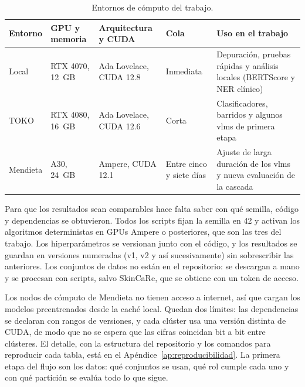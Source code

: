 \begin{table}[H]
    \centering
    \caption{Entornos de cómputo del trabajo.}
    \label{tab:met_entorno}
    \small
    \begin{tabularx}{\textwidth}{@{}>{\raggedright\arraybackslash}p{1.9cm}>{\raggedright\arraybackslash}p{2.5cm}%
        >{\raggedright\arraybackslash}p{2.9cm}>{\raggedright\arraybackslash}p{2.0cm}X@{}}
        \toprule
        \textbf{Entorno} & \textbf{GPU y memoria} & \textbf{Arquitectura y CUDA} & \textbf{Cola} & \textbf{Uso en el trabajo} \\
        \midrule
        Local & RTX 4070, 12~GB & Ada Lovelace, CUDA 12.8 & Inmediata
            & Depuración, pruebas rápidas y análisis locales (BERTScore y NER clínico) \\
        \filasep
        TOKO & RTX 4080, 16~GB & Ada Lovelace, CUDA 12.6 & Corta
            & Clasificadores, barridos y algunos \glspl{vlm} de primera etapa \\
        \filasep
        Mendieta & A30, 24~GB & Ampere, CUDA 12.1 & Entre cinco y siete días
            & Ajuste de larga duración de los \glspl{vlm} y nueva evaluación de la cascada \\
        \bottomrule
    \end{tabularx}
\end{table}

Para que los resultados sean comparables hace falta saber con qué semilla, código y dependencias se obtuvieron. Todos
los scripts fijan la semilla en 42 y activan los algoritmos deterministas en GPUs Ampere o posteriores, que son las
tres del trabajo. Los hiperparámetros se versionan junto con el código, y los resultados se guardan en versiones
numeradas (v1, v2 y así sucesivamente) sin sobrescribir las anteriores. Los conjuntos de datos no están en el
repositorio: se descargan a mano y se procesan con scripts, salvo SkinCaRe, que se obtiene con un token de acceso.

Los nodos de cómputo de Mendieta no tienen acceso a internet, así que cargan los modelos preentrenados desde la caché
local. Quedan dos límites: las dependencias se declaran con rangos de versiones, y cada clúster usa una versión distinta
de CUDA, de modo que no se espera que las cifras coincidan bit a bit entre clústeres. El detalle, con la estructura del
repositorio y los comandos para reproducir cada tabla, está en el Apéndice~\ref{ap:reproducibilidad}. La primera etapa
del flujo son los datos: qué conjuntos se usan, qué rol cumple cada uno y con qué partición se evalúa todo lo que sigue.
